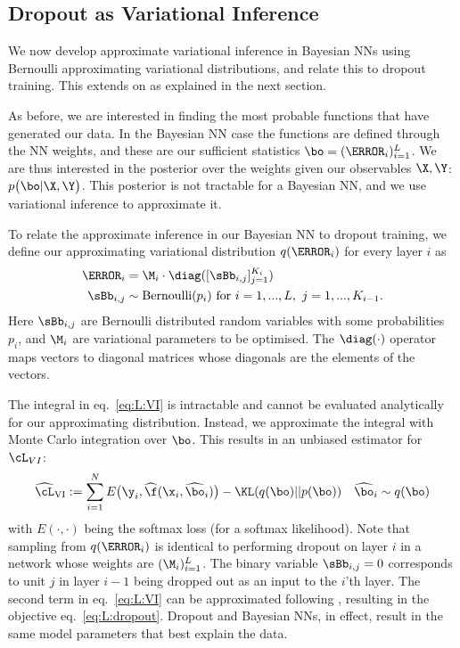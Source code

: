 \subsection{Dropout as Variational Inference}

We now develop approximate variational inference in Bayesian NNs using Bernoulli approximating variational distributions, and relate this to dropout training. This extends on \citep{Gal2015Dropout} as explained in the next section. 

As before, we are interested in finding the most probable functions that have generated our data. In the Bayesian NN case the functions are defined through the NN weights, and these are our sufficient statistics $\bo = (\W_i)_{i=1}^L$. We are thus interested in the posterior over the weights given our observables $\X, \Y$: $p \big( \bo | \X, \Y \big)$. 
This posterior is not tractable for a Bayesian NN, and we use variational inference to approximate it. %

To relate the approximate inference in our Bayesian NN to dropout training, we define our approximating variational distribution $q(\W_i)$ for every layer $i$ as 
\begin{align}\label{eq:approx-dist}
\W_i &= \M_i \cdot \diag([\sBb_{i,j}]_{j=1}^{K_i}) \\
\sBb_{i,j} &\sim \text{Bernoulli}(p_i) \text{ for } i = 1, ..., L, ~ j = 1, ..., K_{i-1}. \notag
\end{align}
Here $\sBb_{i,j}$ are Bernoulli distributed random variables with some probabilities $p_i$, and $\M_i$ are variational parameters to be optimised.
The $\diag(\cdot)$ operator maps vectors to diagonal matrices whose diagonals are the elements of the vectors. 

The integral in eq.\ \eqref{eq:L:VI} is intractable and cannot be evaluated analytically for our approximating distribution. Instead, we approximate the integral with Monte Carlo integration over $\bo$. This results in an unbiased estimator for $\cL_{VI}$:
\begin{align}
\widehat{\cL}_{\text{VI}} := \sum_{i=1}^N E \big( \y_i, \widehat{\f} ( \x_i, \widehat{\bo}_i ) \big) - \KL(q(\bo) || p(\bo)) && \widehat{\bo}_i \sim q(\bo)
\end{align}
with $E(\cdot, \cdot)$ being the softmax loss (for a softmax likelihood).
Note that sampling from $q(\W_i)$ is identical to performing dropout on layer $i$ in a network whose weights are $(\M_i)_{i=1}^L$.
The binary variable $\sBb_{i,j} = 0$ corresponds to unit $j$ in layer $i-1$ being dropped out as an input to the $i$'th layer. The second term in eq.\ \eqref{eq:L:VI} can be approximated following \citep{Gal2015Dropout}, resulting in the objective eq.\ \eqref{eq:L:dropout}.
Dropout and Bayesian NNs, in effect, result in the same model parameters that best explain the data.

